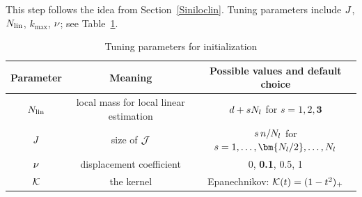 This step follows the idea from Section~\ref{Siniloclin}.
Tuning parameters include
\( J \), \( N_{\operatorname{lin}} \), \( k_{\max} \), \( \nu \); see Table~\ref{TdefSIini}.
\begin{table}[h]
\begin{tabular}{c|c|c}
        \hline
        Parameter & Meaning & Possible values and default choice \\
        \hline
        \( N_{\operatorname{lin}} \) & local mass for local linear estimation & 
        \( d + s N_{l} \) for \( s= 1,2,\bm{3} \) \\
        \( J \) & size of \( \mathcal{J} \) & \( s \, n/N_{l} \) for \( s=1, \ldots , \bm{\nmin/2},\ldots,\nmin \) \\
        \( \nu \)  & displacement coefficient & 0, \textbf{0.1}, 0.5, 1 \\
		\( \mathcal{K} \) & the kernel & Epanechnikov: \( \mathcal{K}(t) = (1-t^{2})_{+} \) \\
		\hline
    \end{tabular}
\caption{Tuning parameters for initialization}    
\label{TdefSIini}
\end{table}

